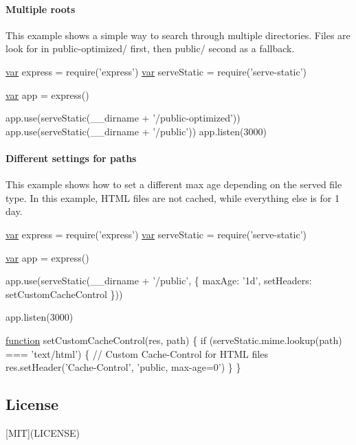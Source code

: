 \paragraph*{Multiple roots}

This example shows a simple way to search through multiple directories. Files are look for in {\ttfamily public-\/optimized/} first, then {\ttfamily public/} second as a fallback.


\begin{DoxyCode}
\hyperlink{018__def_8c_a335628f2e9085305224b4f9cc6e95ed5}{var} express = require(\textcolor{stringliteral}{'express'})
\hyperlink{018__def_8c_a335628f2e9085305224b4f9cc6e95ed5}{var} serveStatic = require('serve-static')

\hyperlink{018__def_8c_a335628f2e9085305224b4f9cc6e95ed5}{var} app = express()

app.use(serveStatic(\_\_dirname + '/public-optimized'))
app.use(serveStatic(\_\_dirname + '/public'))
app.listen(3000)
\end{DoxyCode}


\paragraph*{Different settings for paths}

This example shows how to set a different max age depending on the served file type. In this example, H\+T\+M\+L files are not cached, while everything else is for 1 day.


\begin{DoxyCode}
\hyperlink{018__def_8c_a335628f2e9085305224b4f9cc6e95ed5}{var} express = require(\textcolor{stringliteral}{'express'})
\hyperlink{018__def_8c_a335628f2e9085305224b4f9cc6e95ed5}{var} serveStatic = require('serve-static')

\hyperlink{018__def_8c_a335628f2e9085305224b4f9cc6e95ed5}{var} app = express()

app.use(serveStatic(\_\_dirname + '/public', \{
  maxAge: \textcolor{stringliteral}{'1d'},
  setHeaders: setCustomCacheControl
\}))

app.listen(3000)

\hyperlink{class_test_a51a683fa4fcec142ab1574e00a7b6860}{function} setCustomCacheControl(res, path) \{
  \textcolor{keywordflow}{if} (serveStatic.mime.lookup(path) === \textcolor{stringliteral}{'text/html'}) \{
    \textcolor{comment}{// Custom Cache-Control for HTML files}
    res.setHeader(\textcolor{stringliteral}{'Cache-Control'}, \textcolor{stringliteral}{'public, max-age=0'})
  \}
\}
\end{DoxyCode}


\subsection*{License}

\mbox{[}M\+I\+T\mbox{]}(L\+I\+C\+E\+N\+S\+E) 